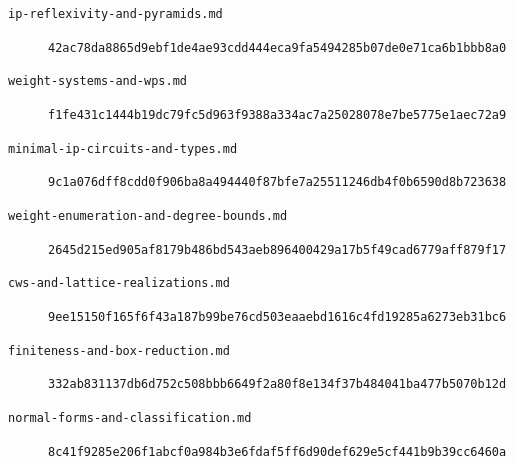 \documentclass[11pt,a4paper,oneside]{report}
\begin{document}
\begin{description}
\item[\texttt{ip-\allowbreak{}reflexiv\allowbreak{}ity-\allowbreak{}and-\allowbreak{}pyramids\allowbreak{}.\allowbreak{}md}]
\texttt{42ac78da\allowbreak{}8865d9eb\allowbreak{}f1de4ae9\allowbreak{}3cdd444e\allowbreak{}ca9fa549\allowbreak{}4285b07d\allowbreak{}e0e71ca6\allowbreak{}b1bbb8a0}
\item[\texttt{weight-\allowbreak{}systems-\allowbreak{}and-\allowbreak{}wps.\allowbreak{}md}]
\texttt{f1fe431c\allowbreak{}1444b19d\allowbreak{}c79fc5d9\allowbreak{}63f9388a\allowbreak{}334ac7a2\allowbreak{}5028078e\allowbreak{}7be5775e\allowbreak{}1aec72a9}
\item[\texttt{minimal-\allowbreak{}ip-\allowbreak{}circuits\allowbreak{}-\allowbreak{}and-\allowbreak{}types.\allowbreak{}md}]
\texttt{9c1a076d\allowbreak{}ff8cdd0f\allowbreak{}906ba8a4\allowbreak{}94440f87\allowbreak{}bfe7a255\allowbreak{}11246db4\allowbreak{}f0b6590d\allowbreak{}8b723638}
\item[\texttt{weight-\allowbreak{}enumerat\allowbreak{}ion-\allowbreak{}and-\allowbreak{}degree-\allowbreak{}bounds.\allowbreak{}md}]
\texttt{2645d215\allowbreak{}ed905af8\allowbreak{}179b486b\allowbreak{}d543aeb8\allowbreak{}96400429\allowbreak{}a17b5f49\allowbreak{}cad6779a\allowbreak{}ff879f17}
\item[\texttt{cws-\allowbreak{}and-\allowbreak{}lattice-\allowbreak{}realizat\allowbreak{}ions.\allowbreak{}md}]
\texttt{9ee15150\allowbreak{}f165f6f4\allowbreak{}3a187b99\allowbreak{}be76cd50\allowbreak{}3eaaebd1\allowbreak{}616c4fd1\allowbreak{}9285a627\allowbreak{}3eb31bc6}
\item[\texttt{finitene\allowbreak{}ss-\allowbreak{}and-\allowbreak{}box-\allowbreak{}reductio\allowbreak{}n.\allowbreak{}md}]
\texttt{332ab831\allowbreak{}137db6d7\allowbreak{}52c508bb\allowbreak{}b6649f2a\allowbreak{}80f8e134\allowbreak{}f37b4840\allowbreak{}41ba477b\allowbreak{}5070b12d}
\item[\texttt{normal-\allowbreak{}forms-\allowbreak{}and-\allowbreak{}classifi\allowbreak{}cation.\allowbreak{}md}]
\texttt{8c41f928\allowbreak{}5e206f1a\allowbreak{}bcf0a984\allowbreak{}b3e6fdaf\allowbreak{}5ff6d90d\allowbreak{}ef629e5c\allowbreak{}f441b9b3\allowbreak{}9cc6460a}
\end{description}
\end{document}
